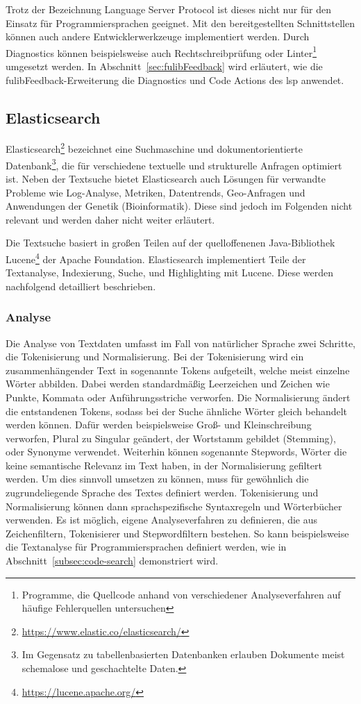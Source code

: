 Trotz der Bezeichnung Language Server Protocol ist dieses nicht nur für den Einsatz für Programmiersprachen geeignet.
Mit den bereitgestellten Schnittstellen können auch andere Entwicklerwerkzeuge implementiert werden.
Durch Diagnostics können beispielsweise auch Rechtschreibprüfung oder Linter\footnote{Programme, die Quellcode anhand von verschiedener Analyseverfahren auf häufige Fehlerquellen untersuchen} umgesetzt werden.
In Abschnitt~\ref{sec:fulibFeedback} wird erläutert, wie die fulibFeedback-Erweiterung die Diagnostics und Code Actions des \ac{lsp} anwendet.

\subsection{Elasticsearch}\label{subsec:elasticsearch}

Elasticsearch\footnote{\url{https://www.elastic.co/elasticsearch/}} bezeichnet eine Suchmaschine und dokumentorientierte Datenbank\footnote{Im Gegensatz zu tabellenbasierten Datenbanken erlauben Dokumente meist schemalose und geschachtelte Daten.}, die für verschiedene textuelle und strukturelle Anfragen optimiert ist.
Neben der Textsuche bietet Elasticsearch auch Lösungen für verwandte Probleme wie Log-Analyse, Metriken, Datentrends, Geo-Anfragen und Anwendungen der Genetik (Bioinformatik).
Diese sind jedoch im Folgenden nicht relevant und werden daher nicht weiter erläutert.

Die Textsuche basiert in großen Teilen auf der quelloffenenen Java-Bibliothek Lucene\footnote{\url{https://lucene.apache.org/}} der Apache Foundation.\cite{elastic-and-lucene}
Elasticsearch implementiert Teile der Textanalyse, Indexierung, Suche, und Highlighting mit Lucene.
Diese werden nachfolgend detailliert beschrieben.

\subsubsection{Analyse}
Die Analyse von Textdaten umfasst im Fall von natürlicher Sprache zwei Schritte, die Tokenisierung und Normalisierung.
Bei der Tokenisierung wird ein zusammenhängender Text in sogenannte Tokens aufgeteilt, welche meist einzelne Wörter abbilden.
Dabei werden standardmäßig Leerzeichen und Zeichen wie Punkte, Kommata oder Anführungsstriche verworfen.
Die Normalisierung ändert die entstandenen Tokens, sodass bei der Suche ähnliche Wörter gleich behandelt werden können.
Dafür werden beispielsweise Groß- und Kleinschreibung verworfen, Plural zu Singular geändert, der Wortstamm gebildet (Stemming), oder Synonyme verwendet.
Weiterhin können sogenannte Stepwords, Wörter die keine semantische Relevanz im Text haben, in der Normalisierung gefiltert werden.
Um dies sinnvoll umsetzen zu können, muss für gewöhnlich die zugrundeliegende Sprache des Textes definiert werden.
Tokenisierung und Normalisierung können dann sprachspezifische Syntaxregeln und Wörterbücher verwenden.\cite{elastic-analysis-overview}
Es ist möglich, eigene Analyseverfahren zu definieren, die aus Zeichenfiltern, Tokenisierer und Stepwordfiltern bestehen.\cite{elastic-custom-analyser}
So kann beispielsweise die Textanalyse für Programmiersprachen definiert werden, wie in Abschnitt~\ref{subsec:code-search} demonstriert wird.

